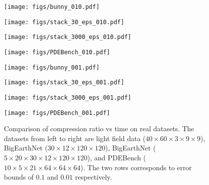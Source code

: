 \begin{figure*}[t]
    \centering
    
    \begin{minipage}{.245\linewidth}
    \texttt{[image: figs/bunny\_010.pdf]}
    \end{minipage}
    \begin{minipage}{.245\linewidth}
    \texttt{[image: figs/stack\_30\_eps\_010.pdf]}
    \end{minipage}
    \begin{minipage}{.245\linewidth}
    \texttt{[image: figs/stack\_3000\_eps\_010.pdf]}
    \end{minipage}
    \begin{minipage}{.245\linewidth}
    \texttt{[image: figs/PDEBench\_010.pdf]}
    \end{minipage}
    
    \begin{minipage}{.245\textwidth}
    \texttt{[image: figs/bunny\_001.pdf]}
    \end{minipage}
    \begin{minipage}{.245\linewidth}
    \texttt{[image: figs/stack\_30\_eps\_001.pdf]}
    \end{minipage}
    \begin{minipage}{.245\linewidth}
    \texttt{[image: figs/stack\_3000\_eps\_001.pdf]}
    \end{minipage}
    \begin{minipage}{.245\linewidth}
    \texttt{[image: figs/PDEBench\_001.pdf]}
    \end{minipage}
    \caption{Comparison of compression ratio vs time on real datasets. The datasets from left to right are light field data ($40 \times 60 \times 3 \times 9 \times 9$), BigEarthNet ($30 \times 12 \times 120 \times 120$), BigEarthNet ($5 \times 20 \times 30 \times 12 \times 120 \times 120$), and PDEBench ($10 \times 5 \times 21 \times 64 \times 64 \times 64$). The two rows corresponds to error bounds of $0.1$ and $0.01$ respectively.}
    \label{fig:eval:real}
    \vspace{20pt}
\end{figure*}

